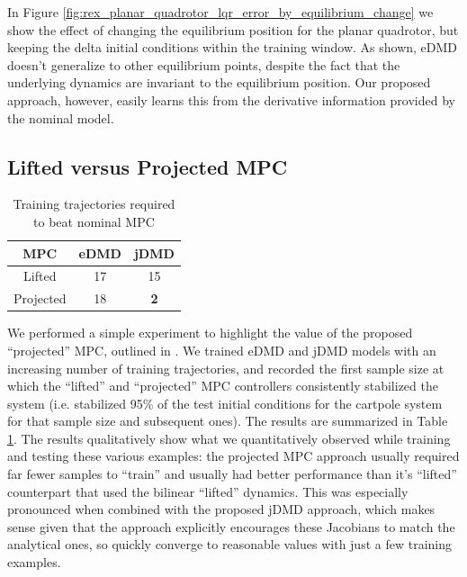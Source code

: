 \documentclass{article}
\begin{document}
In Figure \ref{fig:rex_planar_quadrotor_lqr_error_by_equilibrium_change} we show the effect 
of changing the equilibrium position for the planar quadrotor, but keeping the delta initial
conditions within the training window. As shown, eDMD doesn't generalize to other
equilibrium points, despite the fact that the underlying dynamics are invariant to the
equilibrium position. Our proposed approach, however, easily learns this from the derivative
information provided by the nominal model.

\subsection{Lifted versus Projected MPC}
\begin{table}
  \vspace{-2\baselineskip}
  \begin{tabular}{ccc}\\
    \toprule  
    MPC       & {\color{orange} \textbf{eDMD}} & {\textbf{\color{cyan} jDMD}} \\
    \midrule
    Lifted    & 17   &          15 \\
    Projected & 18   &  \textbf{2} \\
    \bottomrule
  \end{tabular}
  \caption{Training trajectories required to beat nominal MPC}
  \vspace{-1\baselineskip}
  \label{tab:mpc_comp}
\end{table} 
      
We performed a simple experiment to highlight the value of the proposed ``projected'' MPC,
outlined in \label{sec:projected_mpc}. We trained eDMD and jDMD models with an increasing 
number of training trajectories, and recorded the first sample size at which the ``lifted''
and ``projected'' MPC controllers consistently stabilized the system (i.e. stabilized 95\%
of the test initial conditions for the cartpole system for that sample size and subsequent 
ones). The results are summarized in Table \ref{tab:mpc_comp}. The results qualitatively 
show what we quantitatively observed while training and testing these various examples:
the projected MPC approach usually required far fewer samples to ``train'' and usually had 
better performance than it's ``lifted'' counterpart that used the bilinear ``lifted'' 
dynamics. This was especially pronounced when combined with the proposed jDMD approach, 
which makes sense given that the approach explicitly encourages these Jacobians to match 
the analytical ones, so quickly converge to reasonable values with just a few training 
examples.
\end{document}

